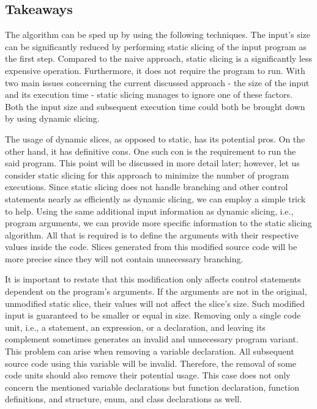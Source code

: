\subsection{Takeaways}


The algorithm can be sped up by using the following techniques.
The input's size can be significantly reduced by performing static 
slicing of the input program as the first step.
Compared to the naive approach, static slicing is a significantly less 
expensive operation.
Furthermore, it does not require the program to run.
With two main issues concerning the current discussed approach - the size 
of the input and its execution time - static slicing manages to ignore 
one of these factors.
Both the input size and subsequent execution time could both be brought 
down by using dynamic slicing.

The usage of dynamic slices, as opposed to static, has its potential pros.
On the other hand, it has definitive cons.
One such con is the requirement to run the said program.
This point will be discussed in more detail later; however, let us consider 
static slicing for this approach to minimize the number of program executions.
Since static slicing does not handle branching and other control statements 
nearly as efficiently as dynamic slicing, we can employ a simple trick 
to help.
Using the same additional input information as dynamic slicing, i.e., 
program arguments, we can provide more specific information 
to the static slicing algorithm.
All that is required is to define the arguments with their respective 
values inside the code.
Slices generated from this modified source code will be more precise 
since they will not contain unnecessary branching.

It is important to restate that this modification only affects control 
statements dependent on the program's arguments.
If the arguments are not in the original, unmodified static slice, their 
values will not affect the slice's size.
Such modified input is guaranteed to be smaller or equal in size.
Removing only a single code unit, i.e., a statement, an expression, 
or a declaration, and leaving its complement sometimes generates 
an invalid and unnecessary program variant.
This problem can arise when removing a variable declaration.
All subsequent source code using this variable will be invalid.
Therefore, the removal of some code units should also remove their potential 
usage.
This case does not only concern the mentioned variable declarations but 
function declaration, function definitions, and structure, enum, 
and class declarations as well.

